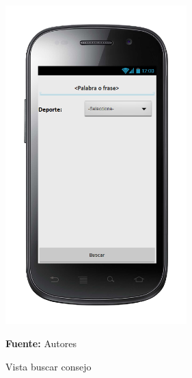 \begin{figure}[!htb]
  \begin{center}
\includegraphics[width=7cm]{./imagenes/UI/Contenidos/buscar_consejo.png}
    \caption{Vista buscar consejo}
    \label{fig:Vista_buscar_consejo}
    \textbf{Fuente:}  Autores
  \end{center}
\end{figure}
